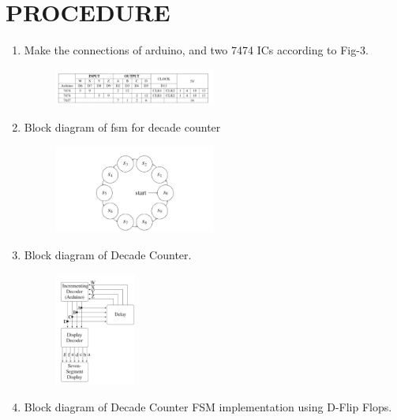 \documentclass[conference]{IEEEtran}
\begin{document}
\section{PROCEDURE}

\begin{enumerate}

\item Make the connections of arduino, and two 7474 ICs according to Fig-3.
        \begin{figure}[h]
        \centering
        \includegraphics[width=0.5\textwidth]{connections.jpg}                                               \caption{\label{fig-3:Gates}}
\end{figure}                                                            
\item Block diagram of fsm for decade counter
\begin{figure}[h]
\centering
\includegraphics[width=0.5\textwidth]{fsm.jpg}                                                   \caption{\label{fig-5:Gates}}
\end{figure}

                                                                        
\item Block diagram of Decade Counter.

\begin{figure}[h]
\centering
\includegraphics[width=0.25\textwidth]{decoder.jpg}
\caption{\label{fig-5:Gates}}
\end{figure}
\item Block diagram of Decade Counter FSM implementation using D-Flip Flops.


\end{enumerate}
\end{document}
